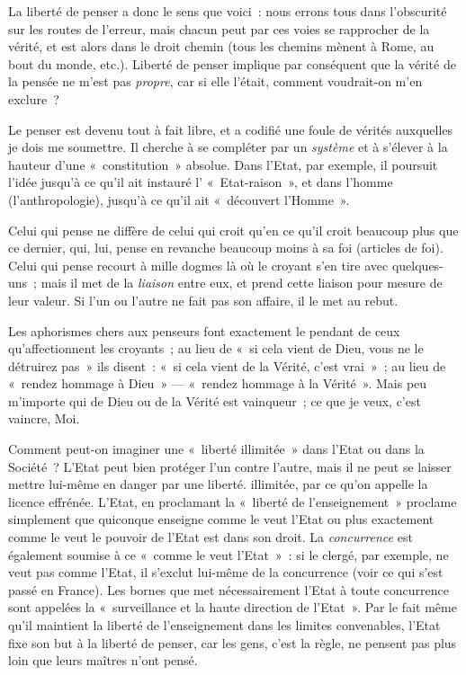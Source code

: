 \documentclass[french,twoside]{book} %
\begin{document}
La liberté de penser a donc le sens que voici : nous errons tous dans l’obscurité sur les routes de l’erreur, mais chacun peut par ces voies se rapprocher de la vérité, et est alors dans le droit chemin (tous les chemins mènent à Rome, au bout du monde, etc.). Liberté de penser implique par conséquent que la vérité de la pensée ne m’est pas \emph{propre}, car si elle l’était, comment voudrait-on m’en exclure ?\par
Le penser est devenu tout à fait libre, et a codifié une foule de vérités auxquelles je dois me soumettre. Il cherche à se compléter par un \emph{système} et à s’élever à la hauteur d’une « constitution » absolue. Dans l’Etat, par exemple, il poursuit l’idée jusqu’à ce qu’il ait instauré l’ « Etat-raison », et dans l’homme (l’anthropologie), jusqu’à ce qu’il ait « découvert l’Homme ».\par
Celui qui pense ne diffère de celui qui croit qu’en ce qu’il croit beaucoup plus que ce dernier, qui, lui,  pense en revanche beaucoup moins à sa foi (articles de foi). Celui qui pense recourt à mille dogmes là où le croyant s’en tire avec quelques-uns ; mais il met de la \emph{liaison} entre eux, et prend cette liaison pour mesure de leur valeur. Si l’un ou l’autre ne fait pas son affaire, il le met au rebut.\par
Les aphorismes chers aux penseurs font exactement le pendant de ceux qu’affectionnent les croyants ; au lieu de « si cela vient de Dieu, vous ne le détruirez pas » ils disent : « si cela vient de la Vérité, c’est vrai » ; au lieu de « rendez hommage à Dieu » — « rendez hommage à la Vérité ». Mais peu m’importe qui de Dieu ou de la Vérité est vainqueur ; ce que je veux, c’est vaincre, Moi.\par
Comment peut-on imaginer une « liberté illimitée » dans l’Etat ou dans la Société ? L’Etat peut bien protéger l’un contre l’autre, mais il ne peut se laisser mettre lui-même en danger par une liberté. illimitée, par ce qu’on appelle la licence effrénée. L’Etat, en proclamant la « liberté de l’enseignement » proclame simplement que quiconque enseigne comme le veut l’Etat ou plus exactement comme le veut le pouvoir de l’Etat est dans son droit. La \emph{concurrence} est également soumise à ce « comme le veut l’Etat » : si le clergé, par exemple, ne veut pas comme l’Etat, il s’exclut lui-même de la concurrence (voir ce qui s’est passé en France). Les bornes que met nécessairement l’Etat à toute concurrence sont appelées la « surveillance et la haute direction de l’Etat ». Par le fait même qu’il maintient la liberté de l’enseignement dans les limites convenables, l’Etat fixe son but à la liberté de penser, car les gens, c’est la règle, ne pensent pas plus loin que leurs maîtres n’ont pensé.\par
\end{document}
